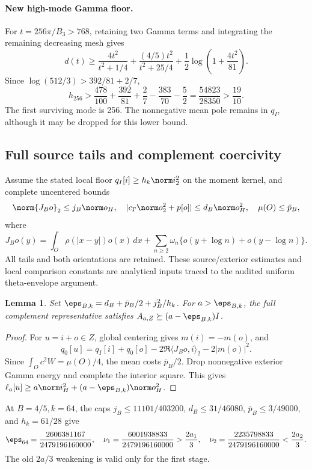 \documentclass[11pt,a4paper]{article}
\numberwithin{equation}{section}
\newtheorem{lemma}[theorem]{Lemma}
\theoremstyle{definition}\newtheorem{definition}[theorem]{Definition}
\theoremstyle{remark}\newtheorem{remark}[theorem]{Remark}
\begin{document}
\paragraph{New high-mode Gamma floor.}
For \(t=256\pi/B_3>768\), retaining two Gamma terms and integrating the
remaining decreasing mesh gives
\[
d(t)\geq\frac{4t^2}{t^2+1/4}
 +\frac{(4/5)t^2}{t^2+25/4}
 +\frac12\log\left(1+\frac{4t^2}{81}\right).
\]
Since \(\log(512/3)>392/81+2/7\),
\[
h_{256}>\frac{478}{100}+\frac{392}{81}+\frac27
 -\frac{383}{70}-\frac52
 =\frac{54823}{28350}>\frac{19}{10}.
\]
The first surviving mode is 256. The nonnegative mean pole remains in
\(q_I\), although it may be dropped for this lower bound.


\subsection{Full source tails and complement coercivity}\label{vrg:sec:complement}
Assume the stated local floor \(q_I[i]\geq h_k\norm i_2^2\) on the
moment kernel, and complete uncentered bounds
\[
\norm{J_Bo}_2\leq j_B\norm o_H,\quad
|c_\Gamma\norm o_2^2+p[o]|\leq d_B\norm o_H^2,\quad
\mu(O)\leq\bar p_B,
\]
where
\[
J_Bo(y)=\int_O\rho(|x-y|)o(x)\,dx
 +\sum_{n\geq2}\omega_n\{o(y+\log n)+o(y-\log n)\}.
\]
All tails and both orientations are retained. These source/exterior
estimates and local comparison constants are analytical inputs traced to
the audited uniform theta-envelope argument.

\begin{lemma}\label{vrg:lem:complement}
Set \(\eps_{B,k}=d_B+\bar p_B/2+j_B^2/h_k\). For \(a>\eps_{B,k}\),
the full complement representative satisfies
\(A_{a,Z}\succeq(a-\eps_{B,k})I\).
\end{lemma}
\begin{proof}
For \(u=i+o\in Z\), global centering gives \(m(i)=-m(o)\), and
\[
q_0[u]=q_I[i]+q_0[o]-2\Re\langle J_Bo,i\rangle_2-2|m(o)|^2.
\]
Since \(\int_Oc^2W=\mu(O)/4\), the mean costs \(\bar p_B/2\).
Drop nonnegative exterior Gamma energy and complete the interior square.
This gives
\(\ell_a[u]\geq a\norm i_H^2+(a-\eps_{B,k})\norm o_H^2\).
\end{proof}
At \(B=4/5,k=64\), the caps
\(j_B\leq11101/403200\), \(d_B\leq31/46080\),
\(\bar p_B\leq3/49000\), and \(h_k=61/28\) give
\[
\eps_{64}=\frac{2606381167}{2479196160000},\quad
\nu_1=\frac{6001938833}{2479196160000}>\frac{2a_1}{3},\quad
\nu_2=\frac{2235798833}{2479196160000}<\frac{2a_2}{3}.
\]
The old \(2a/3\) weakening is valid only for the first stage.
\end{document}
